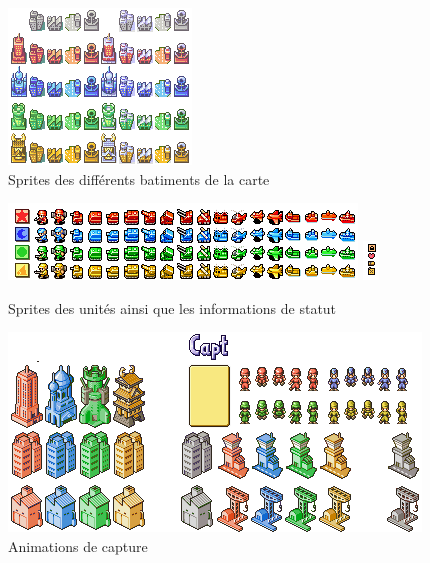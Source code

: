 \documentclass[12pt]{report}
\begin{document}
    \begin{figure}[h]
    \begin{center}
    \includegraphics{advance_wars_sprites_cities.png}
    \end{center}
    \caption{Sprites des différents batiments de la carte}
    \end{figure}
    
    \begin{figure}[h]
    \begin{center}
    \includegraphics{advance_wars_sprites_units.png}
    \includegraphics[scale=1.8]{advance_wars_sprites_units_info.png}
    \end{center}
    \caption{Sprites des unités ainsi que les informations de statut}
    \end{figure}
    
    \begin{figure}[h]
    \begin{center}
    \includegraphics{advance_wars_sprites_capture.png}
    \end{center}
    \caption{Animations de capture}
    \end{figure}
    
\end{document}
